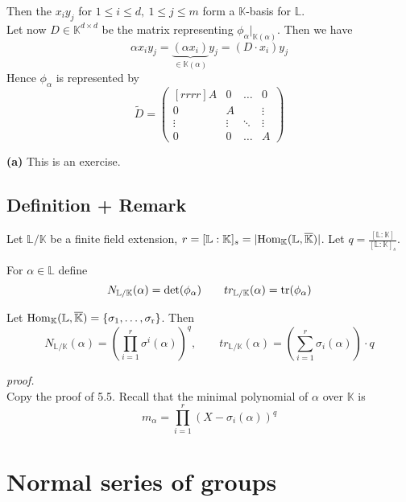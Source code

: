 \documentclass[12pt]{book}
\begin{document}
\begin{spacing}{1.3}
\begin{compactitem}
Then the $x_iy_j$ for $1 \leqslant i \leqslant d, \ 1 \leqslant j \leqslant m$ form a $\mathbb{K}$-basis for $\mathbb{L}$. \\
Let now $D \in \mathbb{K}^{d \times d}$ be the matrix representing $\phi_{\alpha}|_{\mathbb{K}(\alpha)}$. Then we have\\
$$\alpha x_i y_j = \underbrace{\left(\alpha x_i\right)}_{\in \mathbb{K}(\alpha)}y_j = \left(D \cdot x_i\right) y_j$$
Hence $\phi_{\alpha}$ is represented by
$$\tilde{D}= \begin{pmatrix}[rrrr] A & 0 & \ldots & 0 \\ 0 & A & & \vdots \\ \vdots & \vdots & \ddots & \vdots \\ 0 & 0 & \ldots & A \end{pmatrix}$$
\item[\textbf{(a)}] This is an exercise.
\end{compactitem}

\subsection{Definition + Remark} %
Let $\mathbb{L}/\mathbb{K}$ be a finite field extension, $r=[\mathbb{L}:\mathbb{K}]_s=\vert \rm{Hom}_{\mathbb{K}}(\mathbb{L}, \overline{\mathbb{K}}) \vert$. Let $q=\frac{[\mathbb{L}:\mathbb{K}]}{[\mathbb{L}:\mathbb{K}]_s}$.
\begin{compactenum}
\item For $\alpha \in \mathbb{L}$ define 
$$N_{\mathbb{L}/\mathbb{K}}(\alpha)=\det(\phi_{\alpha}) \qquad tr_{\mathbb{L}/\mathbb{K}}(\alpha)=\rm{tr}(\phi_{\alpha})$$
\item Let $\rm{Hom}_{\mathbb{K}}(\mathbb{L}, \overline{\mathbb{K}})=\{\sigma_1, \ldots, \sigma_r\}$. Then
$$N_{\mathbb{L}/\mathbb{K}}(\alpha)=\left(\prod_{i=1}^r \sigma^{i}(\alpha)\right)^q, \qquad tr_{\mathbb{L}/\mathbb{K}}(\alpha)=\left(\sum_{i=1}^r \sigma_{i}(\alpha)\right) \cdot q $$
\end{compactenum}
\textit{proof.}\\
Copy the proof of 5.5. Recall that the minimal polynomial of $\alpha$ over $\mathbb{K}$ is 
$$m_{\alpha}=\prod_{i=1}^r \left(X-\sigma_i(\alpha)\right)^q$$


\renewcommand*\thesection{\S\ \arabic{section}\quad}
\section{Normal series of groups}
\renewcommand*\thesection{\arabic{section}}


\end{spacing}
\end{document}
